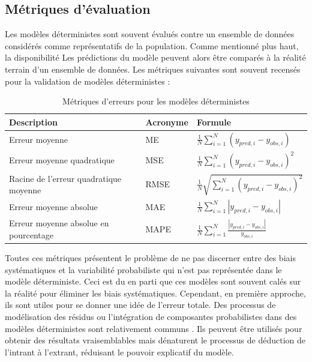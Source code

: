     \subsection{Métriques d'évaluation}
        Les modèles déterministes sont souvent évalués contre un ensemble de données considérés comme représentatifs de la population. Comme mentionné plus haut, la disponibilité  Les prédictions du modèle peuvent alors être comparés à la réalité terrain d'un ensemble de données. Les métriques suivantes sont souvent recensés pour la validation de modèles déterministes \parencite{agard_ind6212_2024}:
        \begin{table}[h]
            \caption{Métriques d'erreurs pour les modèles déterministes}
            \label{tab:deterministic-model-error-metrics}
            \centering
            \begin{tabular}{p{}p{}p{}}
            \hline
                 Description& Acronyme &Formule   \\ \hline
                 Erreur moyenne & ME & $\frac{1}{N}\sum_{i=1}^N (y_{pred,i} - y_{obs,i})$  \\
                 Erreur moyenne quadratique & MSE & $\frac{1}{N}\sum_{i=1}^N (y_{pred,i} - y_{obs,i})^2$  \\
                 Racine de l'erreur quadratique moyenne & RMSE & $\frac{1}{N}\sqrt{\sum_{i=1}^N (y_{pred,i} - y_{obs,i})^2}$\\
                 Erreur moyenne absolue & MAE & $\frac{1}{N} \sum_{i=1}^N \left|y_{pred,i} - y_{obs,i}\right|$ \\
                 Erreur moyenne absolue en pourcentage & MAPE & $\frac{1}{N} \sum_{i=1}^N \frac{\left|y_{pred,i} - y_{obs,i}\right|}{y_{obs,i}}$ \\
                 \hline
            \end{tabular}
        \end{table}
        Toutes ces métriques présentent le problème de ne pas discerner entre des biais systématiques et la variabilité probabiliste qui n'est pas représentée dans le modèle déterministe. Ceci est du en parti que ces modèles sont souvent calés sur la réalité pour éliminer les biais systématiques. Cependant, en première approche, ils sont utiles pour se donner une idée de l'erreur totale. Des processus de modélisation des résidus ou l'intégration de composantes probabilistes dans des modèles déterministes sont relativement communs \parencite{verma_comprehensive_2025,ting_model_2023,wong_biased_2023}. Ils peuvent être utilisés pour obtenir des résultats vraisemblables mais dénaturent le processus de déduction de l'intrant à l'extrant, réduisant le pouvoir explicatif du modèle.
